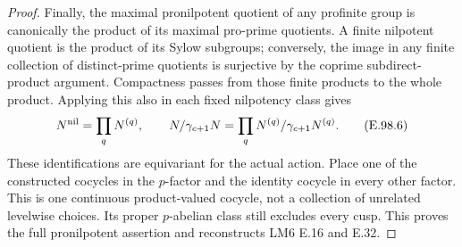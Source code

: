 \begin{proof}
Finally, the maximal pronilpotent quotient of any profinite group is
canonically the product of its maximal pro-prime quotients.  A finite
nilpotent quotient is the product of its Sylow subgroups; conversely,
the image in any finite collection of distinct-prime quotients is
surjective by the coprime subdirect-product argument.  Compactness
passes from those finite products to the whole product.  Applying
this also in each fixed nilpotency class gives
\[
 N^{\rm nil}=\prod_qN^{(q)},\qquad
 N/\gamma_{c+1}N=\prod_qN^{(q)}/\gamma_{c+1}N^{(q)}.
                                                               \tag{E.98.6}
\]
These identifications are equivariant for the actual action.  Place
one of the constructed cocycles in the \(p\)-factor and the identity
cocycle in every other factor.  This is one continuous product-valued
cocycle, not a collection of unrelated levelwise choices.  Its proper
\(p\)-abelian class still excludes every cusp.  This proves the
full pronilpotent assertion and reconstructs LM6 E.16 and E.32.
\end{proof}


